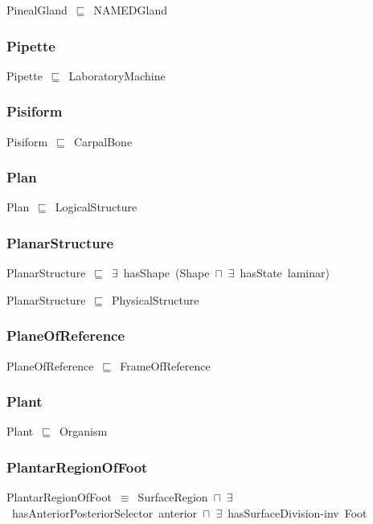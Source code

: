 \documentclass{article}
\begin{document}
PinealGland~\ensuremath{\sqsubseteq}~NAMEDGland~

\subsubsection*{Pipette}

Pipette~\ensuremath{\sqsubseteq}~LaboratoryMachine~

\subsubsection*{Pisiform}

Pisiform~\ensuremath{\sqsubseteq}~CarpalBone~

\subsubsection*{Plan}

Plan~\ensuremath{\sqsubseteq}~LogicalStructure~

\subsubsection*{PlanarStructure}

PlanarStructure~\ensuremath{\sqsubseteq}~\ensuremath{\exists}~hasShape~(Shape~\ensuremath{\sqcap}~\ensuremath{\exists}~hasState~laminar)~

PlanarStructure~\ensuremath{\sqsubseteq}~PhysicalStructure~

\subsubsection*{PlaneOfReference}

PlaneOfReference~\ensuremath{\sqsubseteq}~FrameOfReference~

\subsubsection*{Plant}

Plant~\ensuremath{\sqsubseteq}~Organism~

\subsubsection*{PlantarRegionOfFoot}

PlantarRegionOfFoot~\ensuremath{\equiv}~SurfaceRegion~\ensuremath{\sqcap}~\ensuremath{\exists}~hasAnteriorPosteriorSelector~anterior~\ensuremath{\sqcap}~\ensuremath{\exists}~hasSurfaceDivision-inv~Foot
\end{document}
